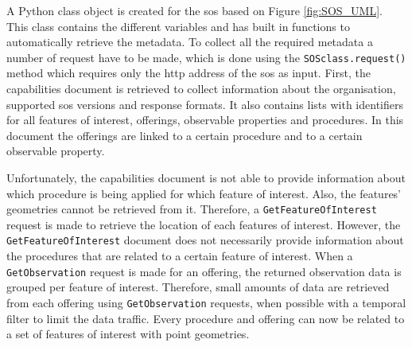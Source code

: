 A Python class object is created for the \ac{sos} based on Figure \ref{fig:SOS_UML}. This class contains the different variables and has built in functions to automatically retrieve the metadata. To collect all the required metadata a number of request have to be made, which is done using the \texttt{SOSclass.request()} method which requires only the \ac{http} address of the \ac{sos} as input. First, the capabilities document is retrieved to collect information about the organisation, supported \ac{sos} versions and response formats. It also contains lists with identifiers for all features of interest, offerings, observable properties and procedures. In this document the offerings are linked to a certain procedure and to a certain observable property. 

Unfortunately, the capabilities document is not able to provide information about which procedure is being applied for which feature of interest. Also, the features' geometries cannot be retrieved from it. Therefore, a \texttt{GetFeatureOfInterest} request is made to retrieve the location of each features of interest. However, the \texttt{GetFeatureOfInterest} document does not necessarily provide information about the procedures that are related to a certain feature of interest. When a \texttt{GetObservation} request is made for an offering, the returned observation data is grouped per feature of interest. Therefore, small amounts of data are retrieved from each offering using \texttt{GetObservation} requests, when possible with a temporal filter to limit the data traffic. Every procedure and offering can now be related to a set of features of interest with point geometries.  
 

